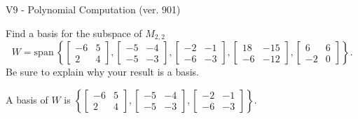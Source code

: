 \begin{exercise}
  \begin{exerciseTitle}V9 - Polynomial Computation (ver. 901)\end{exerciseTitle}
  \begin{exerciseStatement}
    Find a basis for the subspace of \(M_{2,2}\) 
\[W=\mathrm{span}\ \left\{\left[\begin{array}{cc}
-6 & 5 \\
2 & 4
\end{array}\right] , \left[\begin{array}{cc}
-5 & -4 \\
-5 & -3
\end{array}\right] , \left[\begin{array}{cc}
-2 & -1 \\
-6 & -3
\end{array}\right] , \left[\begin{array}{cc}
18 & -15 \\
-6 & -12
\end{array}\right] , \left[\begin{array}{cc}
6 & 6 \\
-2 & 0
\end{array}\right]\right\}.\]
 Be sure to explain why your result is a basis.


  \end{exerciseStatement}
  \begin{exerciseAnswer}
   A basis of \(W\) is  \(\left\{\left[\begin{array}{cc}
-6 & 5 \\
2 & 4
\end{array}\right] , \left[\begin{array}{cc}
-5 & -4 \\
-5 & -3
\end{array}\right] , \left[\begin{array}{cc}
-2 & -1 \\
-6 & -3
\end{array}\right]\right\}\).
  


  \end{exerciseAnswer}
\end{exercise}
